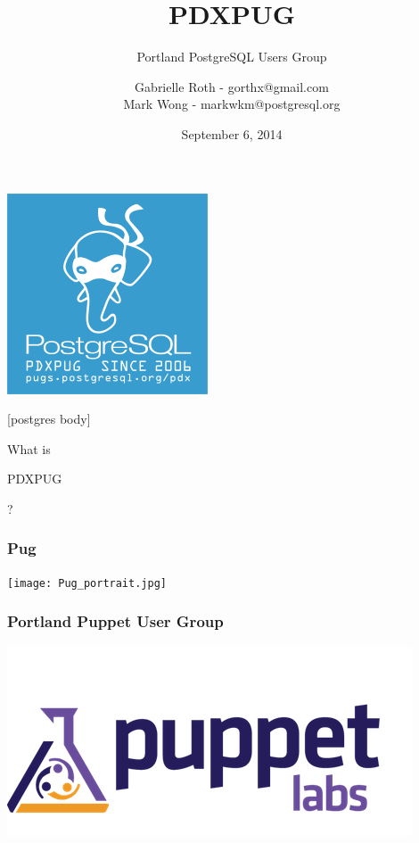 \documentclass{beamer}
\title{PDXPUG}
\subtitle{Portland PostgreSQL Users Group}
\author[gorthx markwkm]{Gabrielle Roth - gorthx@gmail.com\\Mark Wong - markwkm@postgresql.org}
\date{September 6, 2014}
\begin{document}
\frame
{
  \begin{center}
  \includegraphics[scale=1]{pdxpug-logo.png}
  \end{center}
}

\frame{\titlepage}

[postgres body]


\frame
{
  \begin{center}
    What is
  \end{center}
  \begin{center}
    \huge{PDXPUG}
  \end{center}
  \begin{center}
    ?
  \end{center}
}

\frame
{
  \frametitle{Pug}

  \begin{center}
    \texttt{[image: Pug\_portrait.jpg]}
  \end{center}
}

\frame
{
  \frametitle{Portland Puppet User Group}

  \begin{center}
    \includegraphics[width=\textheight]{Puppet_Labs_Logo.png}
  \end{center}
}
\end{document}
